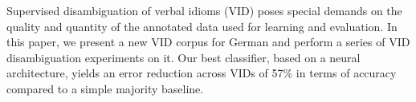 Supervised disambiguation of verbal idioms (VID) poses special demands on the quality and quantity of the annotated data used for learning and evaluation. In this paper, we present a new VID corpus for German and perform a series of VID disambiguation experiments on it. Our best classifier, based on a neural architecture, yields an error reduction across VIDs of 57\% in terms of accuracy compared to a simple majority baseline.
